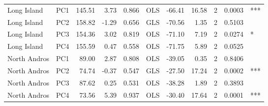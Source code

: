 \begin{tabular}{llrrrlrrrrl}
Long Island & PC1 & 145.51 & 3.73 & 0.866 & OLS & -66.41 & 16.58 & 2 & 0.0003 & ***\\
Long Island & PC2 & 158.82 & -1.29 & 0.656 & GLS & -70.56 & 1.35 & 2 & 0.5103 & \\
Long Island & PC3 & 154.36 & 3.02 & 0.819 & OLS & -71.10 & 7.19 & 2 & 0.0274 & *\\
Long Island & PC4 & 155.59 & 0.47 & 0.558 & OLS & -71.75 & 5.89 & 2 & 0.0525 & \\
North Andros & PC1 & 89.00 & 2.87 & 0.808 & OLS & -39.05 & 0.35 & 2 & 0.8406 & \\
North Andros & PC2 & 74.74 & -0.37 & 0.547 & GLS & -27.50 & 17.24 & 2 & 0.0002 & ***\\
North Andros & PC3 & 87.62 & 0.25 & 0.531 & OLS & -38.28 & 1.89 & 2 & 0.3893 & \\
North Andros & PC4 & 73.56 & 5.39 & 0.937 & OLS & -30.40 & 17.64 & 2 & 0.0001 & ***\\
\bottomrule
\end{tabular}